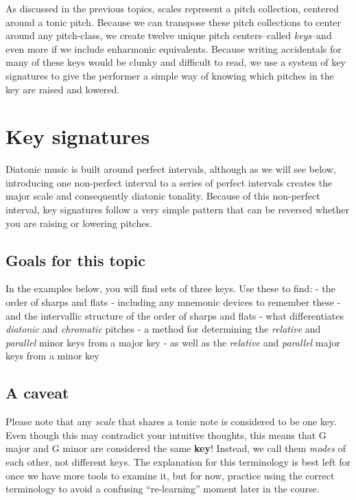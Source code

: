\documentclass{book}
\begin{document}
As discussed in the previous topics, scales represent a pitch collection,
centered around a tonic pitch. Because we can transpose these pitch
collections to center around any pitch-class, we create twelve unique pitch
centers--called \emph{keys}--and even more if we include enharmonic
equivalents. Because writing accidentals for many of these keys would be
clunky and difficult to read, we use a system of key signatures to give the
performer a simple way of knowing which pitches in the key are raised and
lowered.

\hypertarget{key-signatures}{%
\section{Key signatures}\label{key-signatures}}

Diatonic music is built around perfect intervals, although as we will see
below, introducing one non-perfect interval to a series of perfect intervals
creates the major scale and consequently diatonic tonality. Because of this
non-perfect interval, key signatures follow a very simple pattern that can be
reversed whether you are raising or lowering pitches.

\hypertarget{goals-for-this-topic-13}{%
\subsection{Goals for this topic}\label{goals-for-this-topic-13}}

In the examples below, you will find sets of three keys. Use these to find: -
the order of sharps and flats - including any mnemonic devices to remember
these - and the intervallic structure of the order of sharps and flats - what
differentiates \emph{diatonic} and \emph{chromatic} pitches - a method for
determining the \emph{relative} and \emph{parallel} minor keys from a major
key - as well as the \emph{relative} and \emph{parallel} major keys from a
minor key

\hypertarget{a-caveat}{%
\subsection{A caveat}\label{a-caveat}}

Please note that any \emph{scale} that shares a tonic note is considered to be
one key. Even though this may contradict your intuitive thoughts, this means
that G major and G minor are considered the same \textbf{key}! Instead, we
call them \emph{modes} of each other, not different keys. The explanation for
this terminology is best left for once we have more tools to examine it, but
for now, practice using the correct terminology to avoid a confusing
``re-learning'' moment later in the course.
\end{document}
